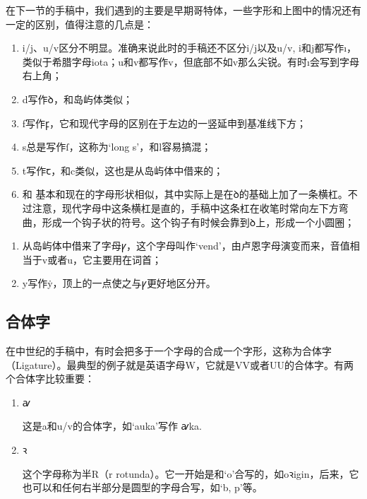 在下一节的手稿中，我们遇到的主要是早期哥特体，一些字形和上图中的情况还有一定的区别，值得注意的几点是：
\begin{info}
    \begin{enumerate}[leftmargin=*]
        \item i/j、u/v区分不明显。准确来说此时的手稿还不区分i/j以及u/v, i和j都写作ı，类似于希腊字母iota；u和v都写作v，但底部不如v那么尖锐。有时ı会写到字母右上角；

        \item d写作{\medieval ꝺ}，和岛屿体类似；

        \item f写作{\medieval ꝼ}，它和现代字母的区别在于左边的一竖延申到基准线下方；

        \item s总是写作{\medieval ſ}，这称为`long s'，和l容易搞混；

        \item t写作{\medieval ꞇ}，和c类似，这也是从岛屿体中借来的；

        \item \th 和 \dh 基本和现在的字母形状相似，其中\dh 实际上是在{\medieval ꝺ}的基础上加了一条横杠。不过注意，现代字母中这条横杠是直的，手稿中这条杠在收笔时常向左下方弯曲，形成一个钩子状的符号。这个钩子有时候会靠到{\medieval ꝺ}上，形成一个小圆圈；
    \end{enumerate}
\end{info}
\begin{info}
    \begin{enumerate}[leftmargin=*, start=7]

        \item 从岛屿体中借来了字母{\medieval ꝩ}，这个字母叫作`vend'，由卢恩字母演变而来，音值相当于v或者u，它主要用在词首；

        \item y写作\.y，顶上的一点使之与{\medieval ꝩ}更好地区分开。
    \end{enumerate}
\end{info}
\subsection{合体字}
在中世纪的手稿中，有时会把多于一个字母的合成一个字形，这称为合体字（Ligature）。最典型的例子就是英语字母W，它就是VV或者UU的合体字。有两个合体字比较重要：
\begin{enumerate}[itemindent=1em]
    \item  {\andron ꜹ}

          这是a和u/v的合体字，如`auka'写作 {\andron ꜹka}.

    \item {\medieval ꝛ}

          这个字母称为半R（r rotunda）。它一开始是和`o'合写的，如{\medieval oꝛigin}，后来，它也可以和任何右半部分是圆型的字母合写，如`b, p'等。
\end{enumerate}

